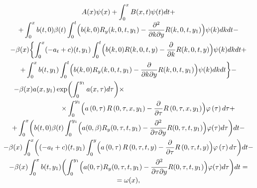 \begin{multline}
\label{utkina:eq7}
 A(x)\psi (x) + \int _0^x B(x,t)\psi (t)dt + \\[-1mm]
 +
\int _0^x b(t, 0)\beta (t)\int _0^t \Bigl(b(k, 0)R_y (k, 0,t,y_1 ) - 
\frac{\partial ^2}{\partial k\partial y}R(k, 0,t,y_1 )\Bigr)\psi (k)dkdt - 
\\
 - \beta (x)\biggl\{
 \int _0^x ( - a_t + c)(t,y_1 )\int _0^t
\Bigl(b(k, 0)R(k, 0,t,y) - \frac{\partial }{\partial k}R(k, 0,t,y)\Bigr)\psi (k)dkdt + \\
 + \int _0^x b(t,y_1 )\int _0^t \Bigl(b(k, 0)R_y (k, 0,t,y_1 ) -
\frac{\partial }{\partial k\partial y}R(k, 0,t,y_1 )\Bigr)\psi (k)dkdt \biggr\} - \\
 - \beta (x)a(x,y_1 )\exp \biggl(\int _0^{y_1 } a(x,\tau )d\tau
\biggr)\times \hspace{6cm} \\
\hspace{2cm}
\times \int _0^{y_1 } \Bigl( {a\left( {0,\tau } \right)R\left( {0,\tau
,x,y_1 } \right) - \frac{\partial }{\partial \tau }R\left( {0,\tau ,x,y_1 }
\right)} \Bigr)\varphi \left( \tau \right)d\tau +
\\
 + \int _0^x 
 \biggl(b(t, 0)\beta (t)
 \int _0^{y_1 } \Bigl( a(0,\beta )R_y
(0,\tau ,t,y_1 ) - \frac{\partial ^2}{\partial \tau \partial y}R(0,\tau
,t,y_1 )\Bigr) \varphi (\tau ) d\tau   \biggr)dt -
\\
 - \beta (x)\int _0^x \biggl(( - a_t + c)(t,y_1 ) \int _0^y \Bigl(
{a\left( {0,\tau } \right)R\left( {0,\tau ,t,y} \right) - \frac{\partial
}{\partial \tau }R\left( {0,\tau ,t,y} \right)} \Bigr)\varphi \left( \tau
\right)d\tau \biggr)dt - 
\\
 - \beta (x)\int _0^x b(t,y_1 )
 \biggl(\int _0^{y_1 } 
 \Bigl( a(0,\tau )R_y
(0,\tau ,t,y_1 ) - \frac{\partial ^2}{\partial \tau \partial y}R(0,\tau
,t,y_1 )\Bigr) \varphi (\tau )d\tau \biggr)dt =
\\[-1mm]
= \omega (x),
\end{multline}


